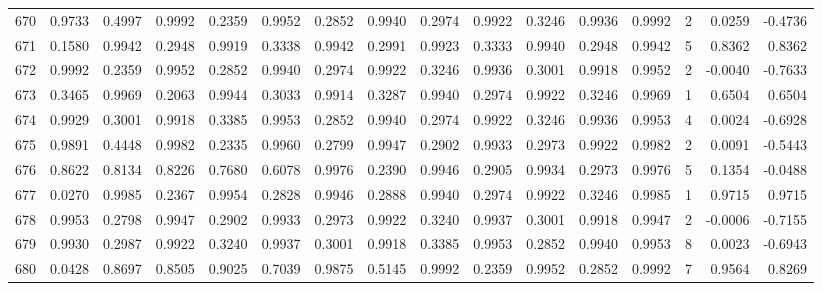\begin{tabular}{lrrrrrrrrrrrrrrr}
670 &      0.9733 &  0.4997 &  0.9992 &  0.2359 &  0.9952 &  0.2852 &  0.9940 &  0.2974 &  0.9922 &  0.3246 &   0.9936 &     0.9992 &      2 &                    0.0259 &                    -0.4736 \\
671 &      0.1580 &  0.9942 &  0.2948 &  0.9919 &  0.3338 &  0.9942 &  0.2991 &  0.9923 &  0.3333 &  0.9940 &   0.2948 &     0.9942 &      5 &                    0.8362 &                     0.8362 \\
672 &      0.9992 &  0.2359 &  0.9952 &  0.2852 &  0.9940 &  0.2974 &  0.9922 &  0.3246 &  0.9936 &  0.3001 &   0.9918 &     0.9952 &      2 &                   -0.0040 &                    -0.7633 \\
673 &      0.3465 &  0.9969 &  0.2063 &  0.9944 &  0.3033 &  0.9914 &  0.3287 &  0.9940 &  0.2974 &  0.9922 &   0.3246 &     0.9969 &      1 &                    0.6504 &                     0.6504 \\
674 &      0.9929 &  0.3001 &  0.9918 &  0.3385 &  0.9953 &  0.2852 &  0.9940 &  0.2974 &  0.9922 &  0.3246 &   0.9936 &     0.9953 &      4 &                    0.0024 &                    -0.6928 \\
675 &      0.9891 &  0.4448 &  0.9982 &  0.2335 &  0.9960 &  0.2799 &  0.9947 &  0.2902 &  0.9933 &  0.2973 &   0.9922 &     0.9982 &      2 &                    0.0091 &                    -0.5443 \\
676 &      0.8622 &  0.8134 &  0.8226 &  0.7680 &  0.6078 &  0.9976 &  0.2390 &  0.9946 &  0.2905 &  0.9934 &   0.2973 &     0.9976 &      5 &                    0.1354 &                    -0.0488 \\
677 &      0.0270 &  0.9985 &  0.2367 &  0.9954 &  0.2828 &  0.9946 &  0.2888 &  0.9940 &  0.2974 &  0.9922 &   0.3246 &     0.9985 &      1 &                    0.9715 &                     0.9715 \\
678 &      0.9953 &  0.2798 &  0.9947 &  0.2902 &  0.9933 &  0.2973 &  0.9922 &  0.3240 &  0.9937 &  0.3001 &   0.9918 &     0.9947 &      2 &                   -0.0006 &                    -0.7155 \\
679 &      0.9930 &  0.2987 &  0.9922 &  0.3240 &  0.9937 &  0.3001 &  0.9918 &  0.3385 &  0.9953 &  0.2852 &   0.9940 &     0.9953 &      8 &                    0.0023 &                    -0.6943 \\
680 &      0.0428 &  0.8697 &  0.8505 &  0.9025 &  0.7039 &  0.9875 &  0.5145 &  0.9992 &  0.2359 &  0.9952 &   0.2852 &     0.9992 &      7 &                    0.9564 &                     0.8269 \\

\end{tabular}
